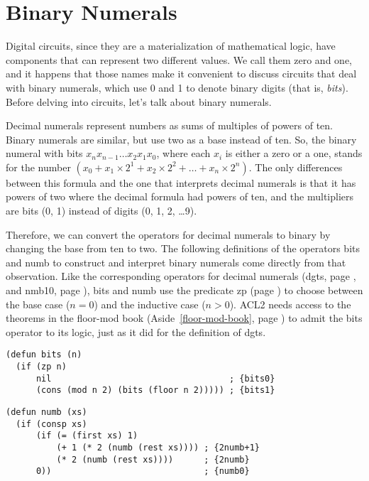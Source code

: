 \section{Binary Numerals}
\label{sec:binary-numerals}

Digital circuits, since they are a materialization of mathematical logic,
have components that can represent two different values.
We call them zero and one, and it happens that those names
make it convenient to discuss circuits that deal with binary numerals,
which use 0 and 1 to denote binary digits (that is,
\emph{bits}).
Before delving into circuits, let's talk about binary numerals.

Decimal numerals represent numbers as sums of multiples of powers of ten.
Binary numerals are similar, but use two as a base instead of ten.
So, the binary numeral with bits $x_nx_{n-1}\dots x_2x_1x_0$,
where each $x_i$ is either a zero or a one, stands for the number
$(x_0 + x_1 \times 2^1 + x_2 \times 2^2 + \dots + x_{n} \times 2^{n})$.
The only differences between this formula and the one that interprets
decimal numerals is that it has powers of two where the decimal formula had
powers of ten, and the multipliers are bits (0, 1) instead of
digits (0, 1, 2, \dots 9).

Therefore, we can convert the operators for decimal numerals to binary
by changing the base from ten to two.
The following definitions of the operators \textsf{bits} and \textsf{numb}
to construct and interpret binary numerals come directly
from that observation.
Like the corresponding operators for decimal numerals
(\textsf{dgts}, page \pageref{dgts-defun}, and \textsf{nmb10}, page \pageref{nmb10-defun}),
\textsf{bits} and \textsf{numb} use the predicate \textsf{zp} (page \pageref{zp-def}) to choose
between the base case ($n = 0$) and the inductive case ($n > 0$).
ACL2 needs access to the theorems
in the floor-mod book (Aside~\ref{floor-mod-book}, page \pageref{floor-mod-book})
to admit the \textsf{bits} operator to its logic,
just as it did for the definition of \textsf{dgts}.

\label{bits-defun}
\begin{Verbatim}
(defun bits (n)
  (if (zp n)
      nil                                   ; {bits0}
      (cons (mod n 2) (bits (floor n 2))))) ; {bits1}
\end{Verbatim}
\label{nmb-defun}
\begin{Verbatim}
(defun numb (xs)
  (if (consp xs)
      (if (= (first xs) 1)
          (+ 1 (* 2 (numb (rest xs)))) ; {2numb+1}
          (* 2 (numb (rest xs))))      ; {2numb}
      0))                              ; {numb0}
\end{Verbatim}

